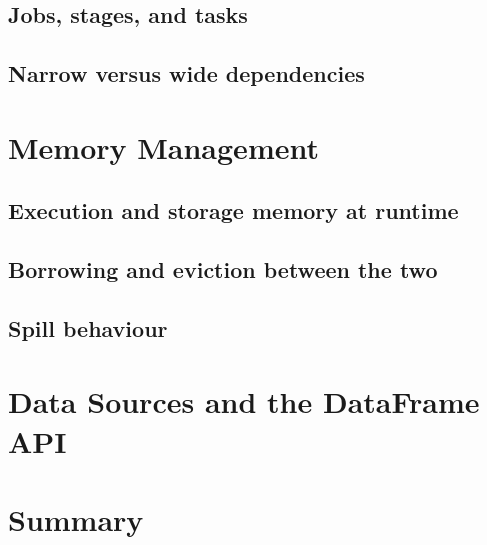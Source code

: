 \subsection{Jobs, stages, and tasks}
\tbd

\subsection{Narrow versus wide dependencies}
\tbd

\section{Memory Management}
\label{sec:fund-memory}


\subsection{Execution and storage memory at runtime}
\tbd

\subsection{Borrowing and eviction between the two}
\tbd

\subsection{Spill behaviour}
\tbd

\section{Data Sources and the DataFrame API}
\label{sec:fund-api}
\tbd

\section{Summary}
\tbd
